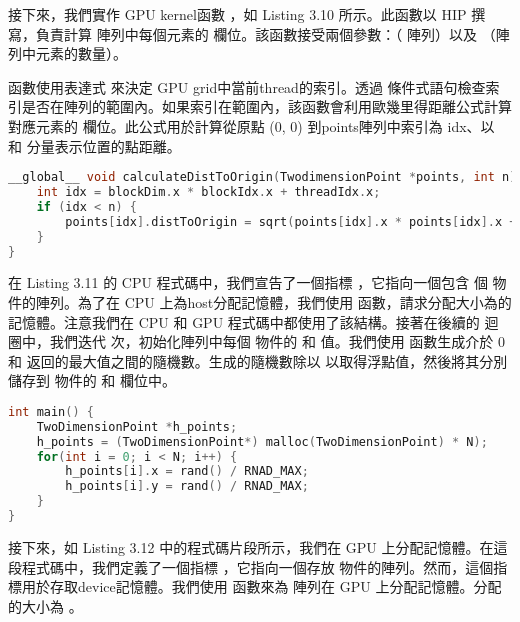 接下來，我們實作 GPU kernel函數 ，如 Listing 3.10 所示。此函數以 HIP 撰寫，負責計算  陣列中每個元素的  欄位。該函數接受兩個參數：（ 陣列）以及 （陣列中元素的數量）。

函數使用表達式  來決定 GPU grid中當前thread的索引。透過  條件式語句檢查索引是否在陣列的範圍內。如果索引在範圍內，該函數會利用歐幾里得距離公式計算對應元素的  欄位。此公式用於計算從原點 (0, 0) 到points陣列中索引為 idx、以  和  分量表示位置的點距離。

\begin{lstlisting}[language=C, caption={TwoDimensionPoint GPU kernel}, label={10th:example}]
__global__ void calculateDistToOrigin(TwodimensionPoint *points, int n) {
    int idx = blockDim.x * blockIdx.x + threadIdx.x;
    if (idx < n) {
        points[idx].distToOrigin = sqrt(points[idx].x * points[idx].x + points[idx].y * points[idx].y;
    }
}
\end{lstlisting}

在 Listing 3.11 的 CPU 程式碼中，我們宣告了一個指標 ，它指向一個包含  個  物件的陣列。為了在 CPU 上為host分配記憶體，我們使用  函數，請求分配大小為的記憶體。注意我們在 CPU 和 GPU 程式碼中都使用了該結構。接著在後續的  迴圈中，我們迭代  次，初始化陣列中每個  物件的  和  值。我們使用  函數生成介於 0 和  返回的最大值之間的隨機數。生成的隨機數除以  以取得浮點值，然後將其分別儲存到  物件的  和  欄位中。

\begin{lstlisting}[language=C, caption={CPU記憶體的配置}, label={11th:example}]
int main() {
    TwoDimensionPoint *h_points;
    h_points = (TwoDimensionPoint*) malloc(TwoDimensionPoint) * N);
    for(int i = 0; i < N; i++) {
        h_points[i].x = rand() / RNAD_MAX;
        h_points[i].y = rand() / RNAD_MAX;
    }
}
\end{lstlisting}

接下來，如 Listing 3.12 中的程式碼片段所示，我們在 GPU 上分配記憶體。在這段程式碼中，我們定義了一個指標 ，它指向一個存放  物件的陣列。然而，這個指標用於存取device記憶體。我們使用  函數來為  陣列在 GPU 上分配記憶體。分配的大小為 。


